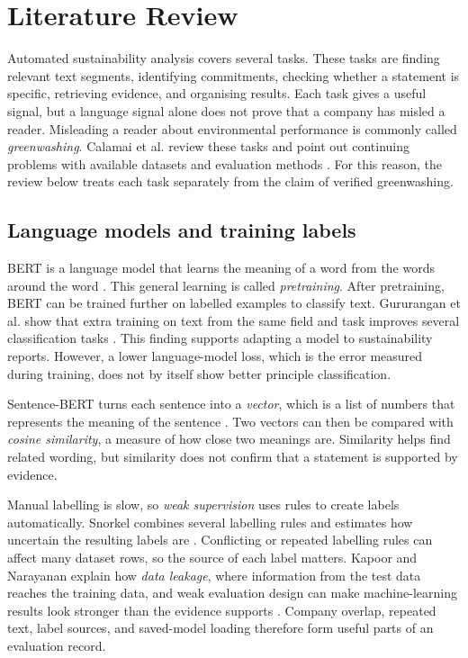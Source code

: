 \section{Literature Review}
\label{sec:literature}

Automated sustainability analysis covers several tasks. These tasks are finding relevant text segments, identifying commitments, checking whether a statement is specific, retrieving evidence, and organising results. Each task gives a useful signal, but a language signal alone does not prove that a company has misled a reader. Misleading a reader about environmental performance is commonly called \emph{greenwashing}. Calamai et al. review these tasks and point out continuing problems with available datasets and evaluation methods \cite{calamai2025}. For this reason, the review below treats each task separately from the claim of verified greenwashing.

\subsection{Language models and training labels}

BERT is a language model that learns the meaning of a word from the words around the word \cite{devlin2019}. This general learning is called \emph{pretraining}. After pretraining, BERT can be trained further on labelled examples to classify text. Gururangan et al. show that extra training on text from the same field and task improves several classification tasks \cite{gururangan2020}. This finding supports adapting a model to sustainability reports. However, a lower language-model loss, which is the error measured during training, does not by itself show better principle classification.

Sentence-BERT turns each sentence into a \emph{vector}, which is a list of numbers that represents the meaning of the sentence \cite{reimers2019}. Two vectors can then be compared with \emph{cosine similarity}, a measure of how close two meanings are. Similarity helps find related wording, but similarity does not confirm that a statement is supported by evidence.

Manual labelling is slow, so \emph{weak supervision} uses rules to create labels automatically. Snorkel combines several labelling rules and estimates how uncertain the resulting labels are \cite{ratner2017}. Conflicting or repeated labelling rules can affect many dataset rows, so the source of each label matters. Kapoor and Narayanan explain how \emph{data leakage}, where information from the test data reaches the training data, and weak evaluation design can make machine-learning results look stronger than the evidence supports \cite{kapoor2023}. Company overlap, repeated text, label sources, and saved-model loading therefore form useful parts of an evaluation record.

